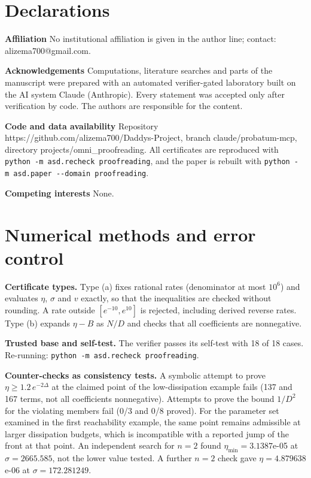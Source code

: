 \documentclass[10pt,twocolumn]{article}
\theoremstyle{definition}\newtheorem{definition}{Definition}\newtheorem{example}{Example}
\begin{document}
\section*{Declarations}\label{declarations}

\textbf{Affiliation} No institutional affiliation is given in the author line; contact: alizema700@gmail.com.

\textbf{Acknowledgements} Computations, literature searches and parts of the manuscript were prepared with an automated verifier-gated laboratory built on the AI system Claude (Anthropic). Every statement was accepted only after verification by code. The authors are responsible for the content.

\textbf{Code and data availability} Repository https://github.com/alizema700/Daddys-Project, branch claude/probatum-mcp, directory projects/omni\_proofreading. All certificates are reproduced with \texttt{python\ -m\ asd.recheck\ proofreading}, and the paper is rebuilt with \texttt{python\ -m\ asd.paper\ -\/-domain\ proofreading}.

\textbf{Competing interests} None.

\appendix

\section{Numerical methods and error control}\label{numerical-methods-and-error-control}

\textbf{Certificate types.} Type (a) fixes rational rates (denominator at most \(10^6\)) and evaluates \(\eta\), \(\sigma\) and \(v\) exactly, so that the inequalities are checked without rounding. A rate outside \([e^{-10}, e^{10}]\) is rejected, including derived reverse rates. Type (b) expands \(\eta - B\) as \(N/D\) and checks that all coefficients are nonnegative.

\textbf{Trusted base and self-test.} The verifier passes its self-test with 18 of 18 cases. Re-running: \texttt{python\ -m\ asd.recheck\ proofreading}.

\textbf{Counter-checks as consistency tests.} A symbolic attempt to prove \(\eta \geq 1.2\,e^{-2\Delta}\) at the claimed point of the low-dissipation example fails (137 and 167 terms, not all coefficients nonnegative). Attempts to prove the bound \(1/D^2\) for the violating members fail (0/3 and 0/8 proved). For the parameter set examined in the first reachability example, the same point remains admissible at larger dissipation budgets, which is incompatible with a reported jump of the front at that point. An independent search for \(n=2\) found \(\eta_{\min} = 3.1387\)e-05 at \(\sigma = 2665.585\), not the lower value tested. A further \(n=2\) check gave \(\eta = 4.879638\)e-06 at \(\sigma = 172.281249\).
\end{document}
